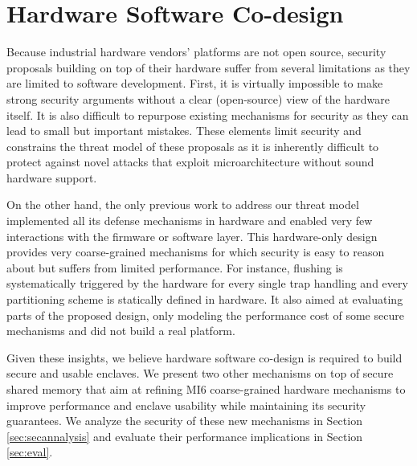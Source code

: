 \section{Hardware Software Co-design}


Because industrial hardware vendors' platforms are not open source, security proposals building on top of their hardware suffer from several limitations as they are limited to software development.
First, it is virtually impossible to make strong security arguments without a clear (open-source) view of the hardware itself.
It is also difficult to repurpose existing mechanisms for security as they can lead to small but important mistakes.
These elements limit security and constrains the threat model of these proposals as it is inherently difficult to protect against novel attacks that exploit microarchitecture without sound hardware support.

On the other hand, the only previous work \cite{bourgeat2019mi6} to address our threat model implemented all its defense mechanisms in hardware and enabled very few interactions with the firmware or software layer.
This hardware-only design provides very coarse-grained mechanisms for which security is easy to reason about but suffers from limited performance.
For instance, flushing is systematically triggered by the hardware for every single trap handling and every partitioning scheme is statically defined in hardware.
It also aimed at evaluating parts of the proposed design, only modeling the performance cost of some secure mechanisms and did not build a real platform.

Given these insights, we believe hardware software co-design is required to build secure and usable enclaves. 
We present two other mechanisms on top of secure shared memory that aim at refining MI6 coarse-grained hardware mechanisms to improve performance and enclave usability while maintaining its security guarantees.
We analyze the security of these new mechanisms in Section \ref{sec:secannalysis} and evaluate their performance implications in Section \ref{sec:eval}.



